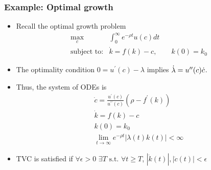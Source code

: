 \documentclass[bigger,handout]{beamer}
\newenvironment{stepitemize}{\begin{itemize}[<+->]}{\end{itemize} }
\begin{document}
\begin{frame}%
 
\frametitle{Example: Optimal growth}

\begin{stepitemize}
\item Recall the optimal growth problem%
\begin{equation*}
\begin{array}{rl}
\max_{c} & \int_{0}^{\infty }e^{-\rho t}u(c)dt \\ 
\text{subject to:} & \dot{k}=f(k)-c,\qquad k(0)=k_{0}%
\end{array}%
\end{equation*}

\item The optimality condition $0=u^{\prime }(c)-\lambda $ implies $\dot{%
\lambda}=u^{\prime \prime }(c)\dot{c}$.

\item Thus, the system of ODEs is 
\begin{gather*}
\dot{c}=\frac{u^{\prime }(c)}{u^{\prime \prime }(c)}\left( \rho -f^{\prime
}(k)\right) \\
\dot{k}=f(k)-c \\
k(0)=k_{0} \\
\lim_{t\rightarrow \infty }e^{-\rho t}|\lambda (t)k(t)|<\infty
\end{gather*}

\item TVC is satisfied if $\forall \epsilon>0$ $\exists T \text{ s.t. } \forall t\geq T$, $\left|\dot{k}(t)\right|,\left|\dot{c}(t)\right|<\epsilon$
\end{stepitemize}

 
 
\end{frame}%
 
 
 
\end{document}
